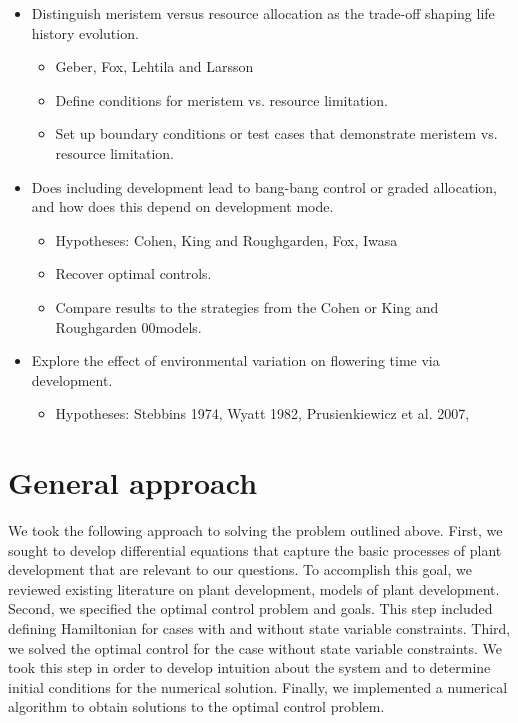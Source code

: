\documentclass[12pt, oneside]{article}   	%
\begin{document}
\begin{itemize}
\item Distinguish meristem versus resource allocation as the trade-off shaping life history evolution.
\begin{itemize}
\item Geber, Fox, Lehtila and Larsson
\item Define conditions for meristem vs. resource limitation.
\item Set up boundary conditions or test cases that demonstrate meristem vs. resource limitation.
\end{itemize}

\item Does including development lead to bang-bang control or graded allocation, and how does this depend on development mode.
\begin{itemize}
\item Hypotheses: Cohen, King and Roughgarden, Fox, Iwasa 
\item Recover optimal controls.
\item Compare results to the strategies from the Cohen or King and Roughgarden 00models. 
\end{itemize}

\item Explore the effect of environmental variation on flowering time via development.
\begin{itemize}
\item Hypotheses: Stebbins 1974, Wyatt 1982, Prusienkiewicz et al. 2007, 
\end{itemize}

\end{itemize}

\section{General approach}

We took the following approach to solving the problem outlined above. First, we sought to develop differential equations that capture the basic processes of plant development that are relevant to our questions. To accomplish this goal, we reviewed existing literature on plant development, models of plant development. Second, we specified the optimal control problem and goals. This step included defining Hamiltonian for cases with and without state variable constraints. Third, we solved the optimal control for the case without state variable constraints. We took this step in order to develop intuition about the system and to determine initial conditions for the numerical solution. Finally, we implemented a numerical algorithm to obtain solutions to the optimal control problem. 
\end{document}
